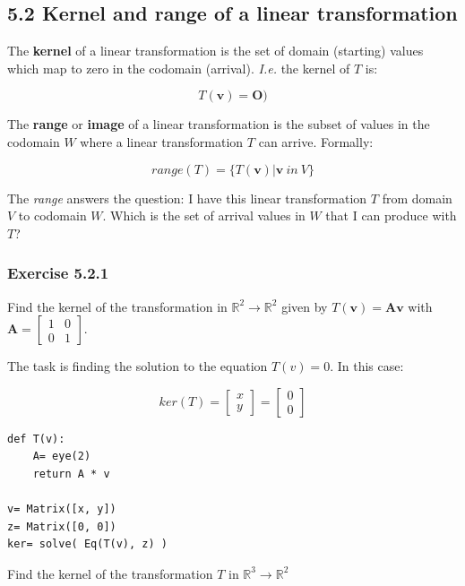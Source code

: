 \subsection{5.2 Kernel and range of a linear transformation}

The \textbf{kernel} of a linear transformation is the set of domain (starting)
values which map to zero in the codomain (arrival). \emph{I.e.} the kernel of
$T$ is:

$$
T(\mathbf{v}) = \mathbf{O})
$$

The \textbf{range} or \textbf{image} of a linear transformation is the
subset of values in the codomain $W$ where a linear transformation $T$ can arrive.
Formally:

$$
range(T) = \{ T(\mathbf{v}) | \mathbf{v}\ in\ V \}
$$

The \emph{range} answers the question: I have this linear transformation $T$ from
domain $V$ to codomain $W$. Which is the set of arrival values in $W$ that I can
produce with $T$?

\subsubsection{Exercise 5.2.1}

Find the kernel of the transformation in $\mathbb{R}^2 \rightarrow \mathbb{R}^2$
given by $T(\mathbf{v}) = \mathbf{Av}$ with $\mathbf{A} = \left[\begin{matrix}1 & 0\\0 & 1\end{matrix}\right]$.

The task is finding the solution to the equation $T(v) = 0$. In this case:

$$
ker(T)= \left[\begin{matrix}x\\y\end{matrix}\right] = \left[\begin{matrix}0\\0\end{matrix}\right]
$$

\begin{verbatim}
def T(v):
    A= eye(2)
    return A * v

v= Matrix([x, y])
z= Matrix([0, 0])
ker= solve( Eq(T(v), z) )
\end{verbatim}

Find the kernel of the transformation $T$ in $\mathbb{R}^3 \rightarrow \mathbb{R}^2$

